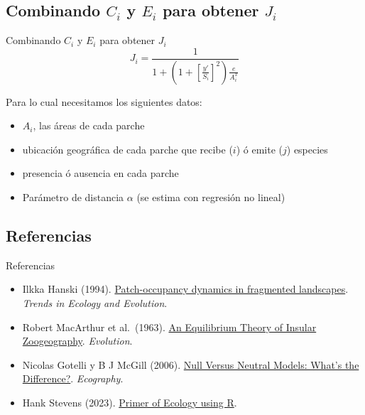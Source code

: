 \documentclass[
  11pt,
  ignorenonframetext,
]{beamer}
\begin{document}
\hypertarget{combinando-c_i-y-e_i-para-obtener-j_i}{%
\subsection{\texorpdfstring{Combinando \(C_i\) y \(E_i\) para obtener
\(J_i\)}{Combinando C\_i y E\_i para obtener J\_i}}\label{combinando-c_i-y-e_i-para-obtener-j_i}}

\begin{frame}{Combinando \(C_i\) y \(E_i\) para obtener \(J_i\)}
\begin{equation}
J_i = \frac{1}{1 + \left( 1 + \left[ \frac{y'}{S_i} \right]^2 \right) \frac{e}{A_i^x}}
\end{equation}

Para lo cual necesitamos los siguientes datos:

\begin{itemize}
\item
  \(A_i\), las áreas de cada parche
\item
  ubicación geográfica de cada parche que recibe (\(i\)) ó emite (\(j\))
  especies
\item
  presencia ó ausencia en cada parche
\item
  Parámetro de distancia \(\alpha\) (se estima con regresión no lineal)
\end{itemize}
\end{frame}

\hypertarget{referencias}{%
\subsection{Referencias}\label{referencias}}

\begin{frame}{Referencias}
\begin{itemize}
\item
  Ilkka Hanski (1994).
  \href{https://doi.org/10.1016/0169-5347(94)90177-5}{Patch-occupancy
  dynamics in fragmented landscapes}. \emph{Trends in Ecology and
  Evolution}.
\item
  Robert MacArthur et al.~(1963).
  \href{https://doi.org/10.2307/2407089}{An Equilibrium Theory of
  Insular Zoogeography}. \emph{Evolution}.
\item
  Nicolas Gotelli y B J McGill (2006).
  \href{https://doi.org/10.1111/j.2006.0906-7590.04714.x}{Null Versus
  Neutral Models: What's the Difference?}. \emph{Ecography}.
\item
  Hank Stevens (2023).
  \href{https://hankstevens.github.io/Primer-of-Ecology/index.html}{Primer
  of Ecology using R}.
\end{itemize}
\end{frame}
\end{document}
